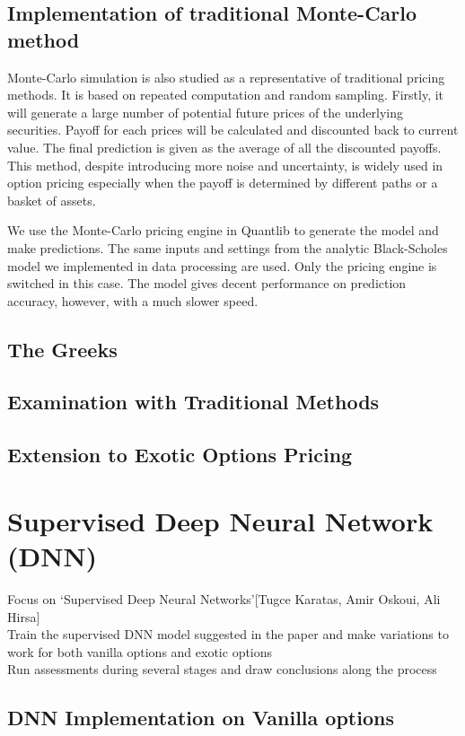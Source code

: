 \documentclass{report}
\begin{document}
\subsection{Implementation of  traditional Monte-Carlo method}
Monte-Carlo simulation is also studied as a representative of traditional pricing methods. It is based on repeated computation and random sampling. Firstly, it will generate a large number of potential future prices of the underlying securities. Payoff for each prices will be calculated and discounted back to current value. The final prediction is given as the average of all the discounted payoffs. This method, despite introducing more noise and uncertainty,  is widely used in option pricing especially when the payoff is determined by different paths or a basket of assets. 

We use the Monte-Carlo pricing engine in Quantlib to generate the model and make predictions.  The same inputs and settings from the analytic Black-Scholes model we implemented in data processing are used. Only the pricing engine is switched in this case. The model gives decent performance on prediction accuracy, however, with a much slower speed.

\subsection{The Greeks}

\subsection{Examination with Traditional Methods}
\subsection{Extension to Exotic Options Pricing}

\section{Supervised Deep Neural Network (DNN)}
Focus on ‘Supervised Deep Neural Networks’[Tugce Karatas, Amir Oskoui, Ali Hirsa]\\
Train the supervised DNN model suggested in the paper and make variations to work for both vanilla options and exotic options\\
Run assessments during several stages and draw conclusions along the process

\subsection{DNN Implementation on Vanilla options}
\end{document}
